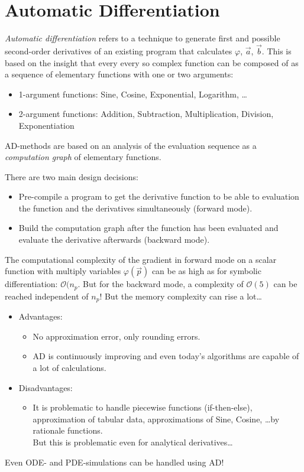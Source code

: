 	\section{Automatic Differentiation}
		\emph{Automatic differentiation} refers to a technique to generate first and possible second-order derivatives of an existing program that calculates \(\varphi\), \(\vec{a}\), \(\vec{b}\). This is based on the insight that every every so complex function can be composed of as a sequence of elementary functions with one or two arguments:
		\begin{itemize}
			\item 1-argument functions: Sine, Cosine, Exponential, Logarithm, \dots
			\item 2-argument functions: Addition, Subtraction, Multiplication, Division, Exponentiation
		\end{itemize}
		AD-methods are based on an analysis of the evaluation sequence as a \emph{computation graph} of elementary functions.
		
		There are two main design decisions:
		\begin{itemize}
			\item Pre-compile a program to get the derivative function to be able to evaluation the function and the derivatives simultaneously (forward mode).
			\item Build the computation graph after the function has been evaluated and evaluate the derivative afterwards (backward mode).
		\end{itemize}
		The computational complexity of the gradient in forward mode on a scalar function with multiply variables \(\varphi(\vec{p})\) can be as high as for symbolic differentiation: \( \mathcal{O}(n_p \). But for the backward mode, a complexity of \( \mathcal{O}(5) \) can be reached independent of \( n_p \)! But the memory complexity can rise a lot\dots
		
		\begin{itemize}
			\item Advantages:
				\begin{itemize}
					\item No approximation error, only rounding errors.
					\item AD is continuously improving and even today's algorithms are capable of a lot of calculations.
				\end{itemize}
			\item Disadvantages:
				\begin{itemize}
					\item It is problematic to handle piecewise functions (if-then-else), approximation of tabular data, approximations of Sine, Cosine, \dots by rationale functions. \\ But this is problematic even for analytical derivatives\dots
				\end{itemize}
		\end{itemize}
		Even ODE- and PDE-simulations can be handled using AD!
		
